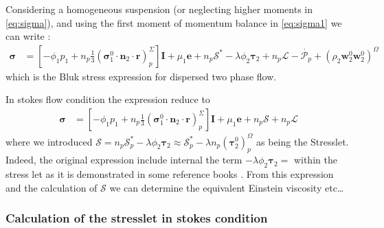 \documentclass[12pt]{My_preprint}
\renewcommand{\ref}[1]{\autoref{#1}}
\begin{document}
Considering a homogeneous suspension (or neglecting higher moments in \ref{eq:sigma}), and using the first moment of momentum balance in \ref{eq:sigma1} we can write :
\begin{align*}
    \bm{\sigma}
    &= [- \phi_1 p_1 
    + n_p \frac{1}{3}(\bm{\sigma}_1^0 \cdot \textbf{n}_2 \cdot \textbf{r})^\Sigma_p] \textbf{I}
    + \mu_1 \textbf{e}
    + n_p \mathscr{S}^*
    - \lambda \phi_2 \bm{\tau}_2
    + n_p \mathscr{L}
    -  \dot{\mathcal{P}_p}
    + (\rho_2 \textbf{w}_2^0  \textbf{w}_2^0 )^\Omega
\end{align*}
which is the Bluk stress expression for dispersed two phase flow. 

In stokes flow condition the expression reduce to 
\begin{align*}
    \bm{\sigma}
    &= [- \phi_1 p_1 
    + n_p \frac{1}{3}(\bm{\sigma}_1^0 \cdot \textbf{n}_2 \cdot \textbf{r})^\Sigma_p] \textbf{I}
    + \mu_1 \textbf{e}
    + n_p \mathscr{S}
    + n_p \mathscr{L}
\end{align*}
where we introduced $\mathscr{S} = n_p \mathscr{S}_p^* - \lambda \phi_2 \bm{\tau}_2 \approx   \mathscr{S}_p^* - \lambda n_p (\bm{\tau}_2^0)^\Omega_p$  as being the Stresslet. 
Indeed, the original expression include internal the term $- \lambda \phi_2 \bm{\tau}_2 = $ within the stress let as it is demonstrated in some reference books \citep{kim2013microhydrodynamics,pozrikidis1992boundary}. 
From this expression and the calculation of $\mathscr{S} $ we can determine the equivalent Einstein viscosity etc\ldots 


\subsubsection{Calculation of the stresslet in stokes condition}
\end{document}
